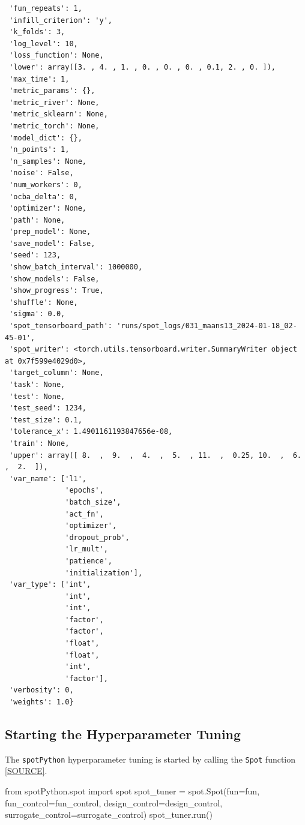 \documentclass[
  letterpaper,
  DIV=11,
  numbers=noendperiod]{scrreprt}
\newenvironment{Shaded}{\begin{snugshade}}{\end{snugshade}}
\newcommand{\ImportTok}[1]{\textcolor[rgb]{0.00,0.46,0.62}{#1}}
\newcommand{\NormalTok}[1]{\textcolor[rgb]{0.00,0.23,0.31}{#1}}
\newcommand{\OperatorTok}[1]{\textcolor[rgb]{0.37,0.37,0.37}{#1}}
\begin{document}
\begin{verbatim}
 'fun_repeats': 1,
 'infill_criterion': 'y',
 'k_folds': 3,
 'log_level': 10,
 'loss_function': None,
 'lower': array([3. , 4. , 1. , 0. , 0. , 0. , 0.1, 2. , 0. ]),
 'max_time': 1,
 'metric_params': {},
 'metric_river': None,
 'metric_sklearn': None,
 'metric_torch': None,
 'model_dict': {},
 'n_points': 1,
 'n_samples': None,
 'noise': False,
 'num_workers': 0,
 'ocba_delta': 0,
 'optimizer': None,
 'path': None,
 'prep_model': None,
 'save_model': False,
 'seed': 123,
 'show_batch_interval': 1000000,
 'show_models': False,
 'show_progress': True,
 'shuffle': None,
 'sigma': 0.0,
 'spot_tensorboard_path': 'runs/spot_logs/031_maans13_2024-01-18_02-45-01',
 'spot_writer': <torch.utils.tensorboard.writer.SummaryWriter object at 0x7f599e4029d0>,
 'target_column': None,
 'task': None,
 'test': None,
 'test_seed': 1234,
 'test_size': 0.1,
 'tolerance_x': 1.4901161193847656e-08,
 'train': None,
 'upper': array([ 8.  ,  9.  ,  4.  ,  5.  , 11.  ,  0.25, 10.  ,  6.  ,  2.  ]),
 'var_name': ['l1',
              'epochs',
              'batch_size',
              'act_fn',
              'optimizer',
              'dropout_prob',
              'lr_mult',
              'patience',
              'initialization'],
 'var_type': ['int',
              'int',
              'int',
              'factor',
              'factor',
              'float',
              'float',
              'int',
              'factor'],
 'verbosity': 0,
 'weights': 1.0}
\end{verbatim}

\subsection{Starting the Hyperparameter
Tuning}\label{sec-call-the-hyperparameter-tuner-31}

The \texttt{spotPython} hyperparameter tuning is started by calling the
\texttt{Spot} function
\href{https://github.com/sequential-parameter-optimization/spotPython/blob/main/src/spotPython/spot/spot.py}{{[}SOURCE{]}}.

\begin{Shaded}
\begin{Highlighting}[]
\ImportTok{from}\NormalTok{ spotPython.spot }\ImportTok{import}\NormalTok{ spot}
\NormalTok{spot\_tuner }\OperatorTok{=}\NormalTok{ spot.Spot(fun}\OperatorTok{=}\NormalTok{fun,}
\NormalTok{                       fun\_control}\OperatorTok{=}\NormalTok{fun\_control,}
\NormalTok{                       design\_control}\OperatorTok{=}\NormalTok{design\_control,}
\NormalTok{                       surrogate\_control}\OperatorTok{=}\NormalTok{surrogate\_control)}
\NormalTok{spot\_tuner.run()}
\end{Highlighting}
\end{Shaded}
\end{document}
